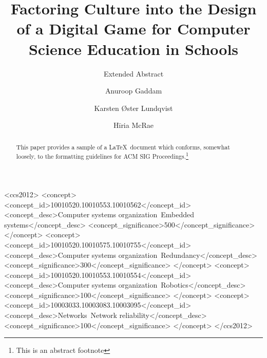 \documentclass[sigconf, authordraft]{acmart}
\begin{document}
\title{Factoring Culture into the Design of a Digital Game for Computer Science Education in Schools}
\subtitle{Extended Abstract}


\author{Anuroop Gaddam}

\author{Karsten {\O}ster Lundqvist}

\author{Hīria McRae}



\renewcommand{\shortauthors}{A. Gaddam et al.}


\begin{abstract}
This paper provides a sample of a \LaTeX\ document which conforms,
somewhat loosely, to the formatting guidelines for
ACM SIG Proceedings.\footnote{This is an abstract footnote}
\end{abstract}

%
%
\begin{CCSXML}
<ccs2012>
 <concept>
  <concept_id>10010520.10010553.10010562</concept_id>
  <concept_desc>Computer systems organization~Embedded systems</concept_desc>
  <concept_significance>500</concept_significance>
 </concept>
 <concept>
  <concept_id>10010520.10010575.10010755</concept_id>
  <concept_desc>Computer systems organization~Redundancy</concept_desc>
  <concept_significance>300</concept_significance>
 </concept>
 <concept>
  <concept_id>10010520.10010553.10010554</concept_id>
  <concept_desc>Computer systems organization~Robotics</concept_desc>
  <concept_significance>100</concept_significance>
 </concept>
 <concept>
  <concept_id>10003033.10003083.10003095</concept_id>
  <concept_desc>Networks~Network reliability</concept_desc>
  <concept_significance>100</concept_significance>
 </concept>
</ccs2012>
\end{CCSXML}
\end{document}
